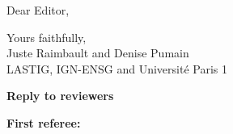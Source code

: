 \documentclass[10pt,a4paper,sans]{moderncv}        %
\begin{document}
\date{\today}
\opening{Dear Editor,}
\closing{Yours faithfully,\\
Juste Raimbault and Denise Pumain\\
LASTIG, IGN-ENSG and Universit{\'e} Paris 1
}




\justify





\textbf{Reply to reviewers}


\medskip


\textbf{First referee:}

\medskip

\end{document}
